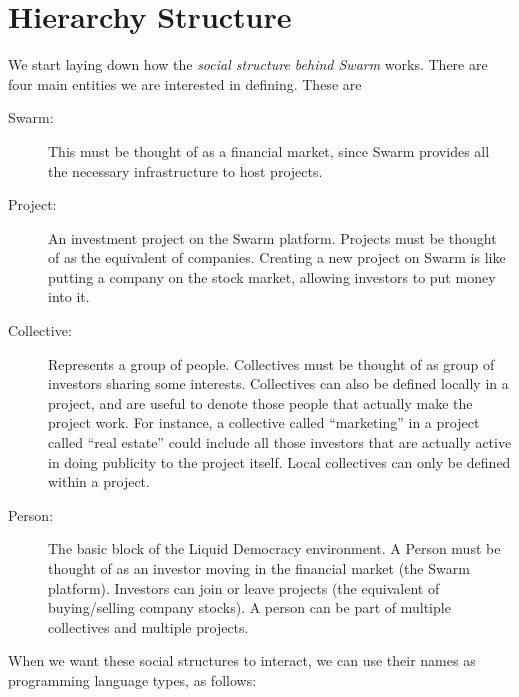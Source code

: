 \documentclass[submission, copyright,creativecommons,sharealike,noncommercial]{eptcs}
\begin{document}
\section{Hierarchy Structure}
	We start laying down how the \emph{social structure behind Swarm} works. There are four main entities we are interested in defining. These are
	\begin{description}
		\item[Swarm:] This must be thought of as a financial market, since Swarm provides all the necessary infrastructure to host projects.
		
		\item[Project:] An investment project on the Swarm platform. Projects must be thought of as the equivalent of companies. Creating a new project on Swarm is like putting a company on the stock market, allowing investors to put money into it.
		
		\item[Collective:] Represents a group of people. Collectives must be thought of as group of investors sharing some interests. Collectives can also be defined locally in a project, and are useful to denote those people that actually make the project work. For instance, a collective called ``marketing'' in a project called ``real estate'' could include all those investors that are actually active in doing publicity to the project itself. Local collectives can only be defined within a project.
		
		\item[Person:] The basic block of the Liquid Democracy environment. A Person must be thought of as an investor moving in the financial market (the Swarm platform). Investors can join or leave projects (the equivalent of buying/selling company stocks). A person can be part of multiple collectives and multiple projects.
	\end{description}
	When we want these social structures to interact, we can use their names as programming language types, as follows:
\end{document}

